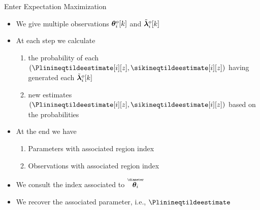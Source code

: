 \documentclass[aspectratio=169]{beamer}
\begin{document}
\begin{frame}{Enter Expectation Maximization}

  \begin{itemize}[<+(1)->]
    \item We give multiple observations $\boldsymbol{\theta}_{i}^{o}[k]$ and $\tilde{\boldsymbol{\lambda}}_{i}^{o}[k]$
    \item At each step we calculate
          \begin{enumerate}
            \item[\encircle{E}] the probability of each $(\Plinineqtildeestimate[i][z],\sikineqtildeestimate[i][z])$ having generated each $\tilde{\boldsymbol{\lambda}}_{i}^{o}[k]$
            \item[\encircle{M}] new estimates $(\Plinineqtildeestimate[i][z],\sikineqtildeestimate[i][z])$ based on the probabilities
          \end{enumerate}
  \end{itemize}

  \begin{itemize}[<+(1)->]
    \item At the end we have
          \begin{enumerate}
            \item Parameters with associated region index
            \item Observations with associated region index
          \end{enumerate}
    \item We consult the index associated to $\thetairestricted$
    \item We recover the associated parameter, i.e., $\Plinineqtildeestimate$
  \end{itemize}
\end{frame}
\end{document}
